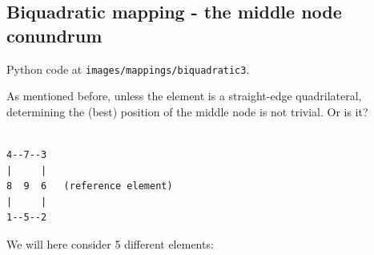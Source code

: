 \subsection{Biquadratic mapping - the middle node conundrum}

Python code at {\tt images/mappings/biquadratic3}.

As mentioned before, unless the element is a straight-edge quadrilateral, 
determining the (best) position of the middle node is not trivial. Or is it?


\begin{verbatim}

4--7--3
|     |
8  9  6   (reference element)
|     |
1--5--2

\end{verbatim}

We will here consider 5 different elements:

